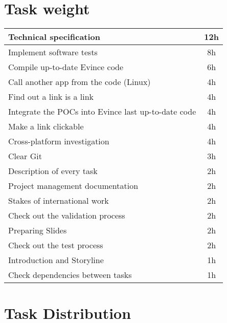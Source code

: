 \documentclass{article}%
\begin{document}
\section{Task weight}

\begin{tabular}{|l|c|}
\hline
Technical specification & 12h \\ \hline
Implement software tests & 8h \\ \hline
Compile up-to-date Evince code & 6h \\ \hline
Call another app from the code (Linux) & 4h \\ \hline
Find out a link is a link & 4h \\ \hline
Integrate the POCs into Evince last up-to-date code & 4h \\ \hline
Make a link clickable & 4h \\ \hline
Cross-platform investigation & 4h \\ \hline
Clear Git & 3h \\ \hline
Description of every task & 2h \\ \hline
Project management documentation & 2h \\ \hline
Stakes of international work & 2h \\ \hline
Check out the validation process & 2h \\ \hline
Preparing Slides & 2h \\ \hline
Check out the test process & 2h \\ \hline
Introduction and Storyline & 1h \\ \hline
Check dependencies between tasks & 1h \\ \hline
\end{tabular}

\section{Task Distribution}
\begin{table}[h]
\centering
\caption{Implementation tasks}
\label{my-label}
\end{table}
\end{document}
